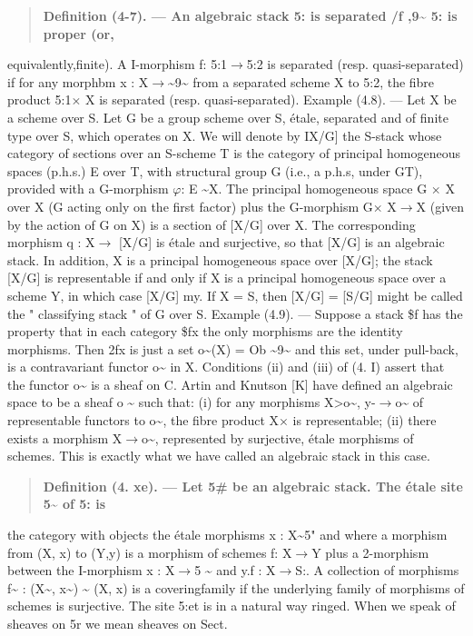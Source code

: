 \documentclass[11pt]{article}
\theoremstyle{plain}
\theoremstyle{definition}
\theoremstyle{remark}
\begin{document}
\begin{quote}\textbf{Definition (4-7). --- An algebraic stack 5: is separated /f ,9\textasciitilde{} 5: is proper (or,}\end{quote}
equivalently,finite). A I-morphism f: 5:1$\to$5:2 is separated (resp. quasi-separated) if for any morphbm x : X$\to$\textasciitilde{}9\textasciitilde{} from a separated scheme X to 5:2, the fibre product 5:1$\times$ X is separated (resp. quasi-separated). Example (4.8). --- Let X be a scheme over S. Let G be a group scheme over S, \'etale, separated and of finite type over S, which operates on X. We will denote by IX/G] the S-stack whose category of sections over an S-scheme T is the category of principal homogeneous spaces (p.h.s.) E over T, with structural group G (i.e., a p.h.s, under GT), provided with a G-morphism $\varphi$: E \textasciitilde{}X. The principal homogeneous space G $\times$ X over X (G acting only on the first factor) plus the G-morphism G$\times$ X$\to$X (given by the action of G on X) is a section of [X/G] over X. The corresponding morphism q : X$\to$ [X/G] is \'etale and surjective, so that [X/G] is an algebraic stack. In addition, X is a principal homogeneous space over [X/G]; the stack [X/G] is representable if and only if X is a principal homogeneous space over a scheme Y, in which case [X/G] my. If X = S, then [X/G] = [S/G] might be called the " classifying stack " of G over S. Example (4.9). --- Suppose a stack \$f has the property that in each category \$fx the only morphisms are the identity morphisms. Then 2fx is just a set o\textasciitilde{}(X) = Ob \textasciitilde{}9\textasciitilde{} and this set, under pull-back, is a contravariant functor o\textasciitilde{} in X. Conditions (ii) and (iii) of (4. I) assert that the functor o\textasciitilde{} is a sheaf on C. Artin and Knutson [K] have defined an algebraic space to be a sheaf o \textasciitilde{} such that: (i) for any morphisms X>o\textasciitilde{}, y-$\to$o\textasciitilde{} of representable functors to o\textasciitilde{}, the fibre product X$\times$ is representable; (ii) there exists a morphism X$\to$o\textasciitilde{}, represented by surjective, \'etale morphisms of schemes. This is exactly what we have called an algebraic stack in this case.

\begin{quote}\textbf{Definition (4. xe). --- Let 5\# be an algebraic stack. The \'etale site 5\textasciitilde{} of 5: is}\end{quote}
the category with objects the \'etale morphisms x : X\textasciitilde{}5" and where a morphism from (X, x) to (Y,y) is a morphism of schemes f: X$\to$Y plus a 2-morphism between the I-morphism x : X$\to$5 \textasciitilde{} and y.f : X$\to$S:. A collection of morphisms f\textasciitilde{} : (X\textasciitilde{}, x\textasciitilde{}) \textasciitilde{} (X, x) is a coveringfamily if the underlying family of morphisms of schemes is surjective. The site 5:et is in a natural way ringed. When we speak of sheaves on 5r we mean sheaves on Sect.
\end{document}
